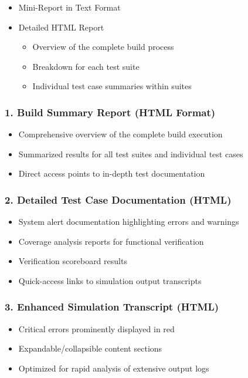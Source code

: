 \documentclass{article}
\begin{document}
\begin{itemize}
    \item Mini-Report in Text Format
    \item Detailed HTML Report
    \begin{itemize}
        \item Overview of the complete build process
        \item Breakdown for each test suite
        \item Individual test case summaries within suites
    \end{itemize}
\end{itemize}

\subsubsection*{1. Build Summary Report (HTML Format)}
\begin{itemize}
    \item Comprehensive overview of the complete build execution
    \item Summarized results for all test suites and individual test cases
    \item Direct access points to in-depth test documentation
\end{itemize}

\subsubsection*{2. Detailed Test Case Documentation (HTML)}
\begin{itemize}
    \item System alert documentation highlighting errors and warnings
    \item Coverage analysis reports for functional verification
    \item Verification scoreboard results
    \item Quick-access links to simulation output transcripts
\end{itemize}

\subsubsection*{3. Enhanced Simulation Transcript (HTML)}
\begin{itemize}
    \item Critical errors prominently displayed in red
    \item Expandable/collapsible content sections
    \item Optimized for rapid analysis of extensive output logs
\end{itemize}
\end{document}
